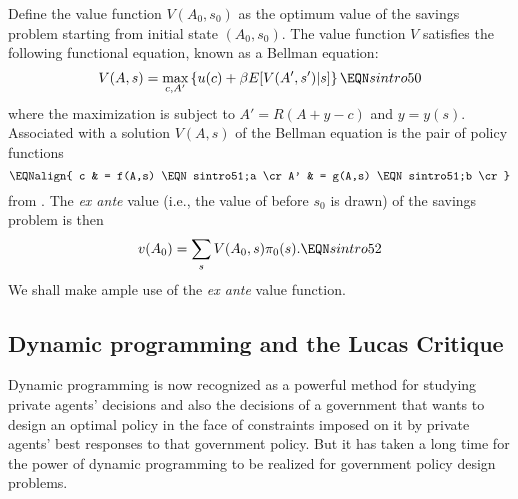   Define the   value function $V(A_0,s_0)$ as the optimum value
of the savings problem starting from initial state $(A_0, s_0)$.
The value function $V$ satisfies the following functional
equation, known as a Bellman equation:
$$ V(A,s) = \max_{c,A'}\left\{ u(c) + \beta E[ V(A',s') |s] \right\}
  \EQN sintro50 $$
where the maximization is subject to
$A' = R(A+y-c)$ and $y = y(s)$.
Associated with a  solution $V(A,s)$ of the Bellman equation is
the pair of policy functions
$$\EQNalign{ c & = f(A,s) \EQN sintro51;a \cr
   A' & = g(A,s) \EQN sintro51;b \cr} $$
from .
The {\it ex ante\/} value  (i.e., the value of
 before $s_0$ is drawn)
of the savings problem
is then
$$ v(A_0) = \sum_{s} V(A_0,s) \pi_0(s) . \EQN sintro52 $$
We shall make ample use of the {\it ex ante\/} value function.





\subsection{Dynamic programming and the Lucas Critique}
Dynamic programming is now recognized as
a powerful method for studying private
agents' decisions and also the decisions
of a government that wants to design an optimal
policy in the face of constraints imposed on it by private agents'
best responses to that government policy.  But it has taken
a long time for the power of dynamic programming to be realized
for government policy design problems.

